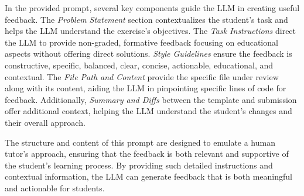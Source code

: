 \documentclass[manuscript,screen,review]{acmart}
\begin{document}
In the provided prompt, several key components guide the LLM in creating useful feedback. The \textit{Problem Statement} section contextualizes the student's task and helps the LLM understand the exercise's objectives.
The \textit{Task Instructions} direct the LLM to provide non-graded, formative feedback focusing on educational aspects without offering direct solutions.
\textit{Style Guidelines} ensure the feedback is constructive, specific, balanced, clear, concise, actionable, educational, and contextual.
The \textit{File Path and Content} provide the specific file under review along with its content, aiding the LLM in pinpointing specific lines of code for feedback.
Additionally, \textit{Summary and Diffs} between the template and submission offer additional context, helping the LLM understand the student's changes and their overall approach.

The structure and content of this prompt are designed to emulate a human tutor's approach, ensuring that the feedback is both relevant and supportive of the student's learning process.
By providing such detailed instructions and contextual information, the LLM can generate feedback that is both meaningful and actionable for students.
\end{document}
